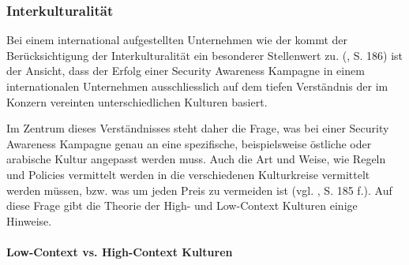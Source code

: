 \documentclass[../../main.tex]{subfiles}
\begin{document}
\subsubsection{Interkulturalität}

\begin{sloppypar}
Bei einem international aufgestellten Unternehmen wie der \companyshort{} kommt der Berücksichtigung der Interkulturalität ein besonderer Stellenwert zu. \citeauthor{helisch_security_2009} (\citeyear{helisch_security_2009}, S. 186) ist der Ansicht, dass der Erfolg einer Security Awareness Kampagne in einem internationalen Unternehmen ausschliesslich auf dem tiefen Verständnis der im Konzern vereinten unterschiedlichen Kulturen basiert.

Im Zentrum dieses Verständnisses steht daher die Frage, was bei einer Security Awareness Kampagne genau an eine spezifische, beispielsweise östliche oder arabische Kultur angepasst werden muss. Auch die Art und Weise, wie Regeln und Policies vermittelt werden in die verschiedenen Kulturkreise vermittelt werden müssen, bzw. was um jeden Preis zu vermeiden ist (vgl. \citeauthor{helisch_security_2009} \citeyear{helisch_security_2009}, S. 185 f.). Auf diese Frage gibt die Theorie der High- und Low-Context Kulturen einige Hinweise.
\end{sloppypar}

\paragraph*{Low-Context vs. High-Context Kulturen}\mbox{}
\end{document}
